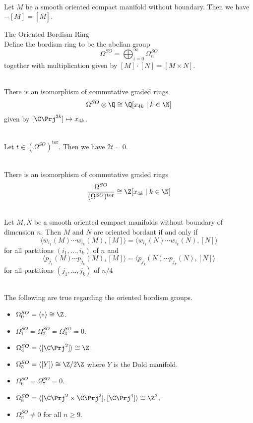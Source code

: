 \documentclass[a4paper]{article}
\begin{document}
\begin{lmm}{}{}\\
Let $M$ be a smooth oriented compact manifold without boundary. Then we have $-[M]=[\overline{M}]$. 
\end{lmm}

\begin{defn}{The Oriented Bordism Ring}{}\\
Define the bordism ring to be the abelian group $$\Omega^{SO}=\bigoplus_{i=0}^\infty\Omega_n^{SO}$$ together with multiplication given by $[M]\cdot[N]=[M\times N]$. 
\end{defn}

\begin{prp}{}{}\\
There is an isomorphism of commutative graded rings $$\Omega^{SO}\otimes\Q\cong\Q[x_{4k}\;|\;k\in\N]$$ given by $[\C\Prj^{2k}]\mapsto x_{4k}$. 
\end{prp}

\begin{prp}{}{}\\
Let $t\in(\Omega^{SO})^\text{tor}$. Then we have $2t=0$. 
\end{prp}

\begin{prp}{}{}\\
There is an isomorphism of commutative graded rings $$\frac{\Omega^{SO}}{(\Omega^{SO})^\text{tor}}\cong\Z[x_{4k}\;|\;k\in\N]$$
\end{prp}

\begin{prp}{}{}\\
Let $M,N$ be a smooth oriented compact manifolds without boundary of dimension $n$. Then $M$ and $N$ are oriented bordant if and only if $$\langle w_{i_1}(M)\cdots w_{i_k}(M),[M]\rangle=\langle w_{i_1}(N)\cdots w_{i_k}(N),[N]\rangle$$ for all partitions $(i_1,\dots,i_k)$ of $n$ and $$\langle p_{j_1}(M)\cdots p_{j_k}(M),[M]\rangle=\langle p_{j_1}(N)\cdots p_{j_k}(N),[N]\rangle$$ for all partitions $(j_1,\dots,j_k)$ of $n/4$
\end{prp}

\begin{prp}{}{}\\
The following are true regarding the oriented bordism groups. 
\begin{itemize}
\item $\Omega_0^{SO}=\langle\ast\rangle\cong\Z$. 
\item $\Omega_1^{SO}=\Omega_2^{SO}=\Omega_3^{SO}=0$. 
\item $\Omega_4^{SO}=\langle[\C\Prj^2]\rangle\cong\Z$. 
\item $\Omega_5^{SO}=\langle[Y]\rangle\cong\Z/2\Z$ where $Y$ is the Dold manifold. 
\item $\Omega_6^{SO}=\Omega_7^{SO}=0$. 
\item $\Omega_8^{SO}=\langle[\C\Prj^2\times\C\Prj^2],[\C\Prj^4]\rangle\cong\Z^2$. 
\item $\Omega_n^{SO}\neq 0$ for all $n\geq 9$. 
\end{itemize}
\end{prp}
\end{document}
